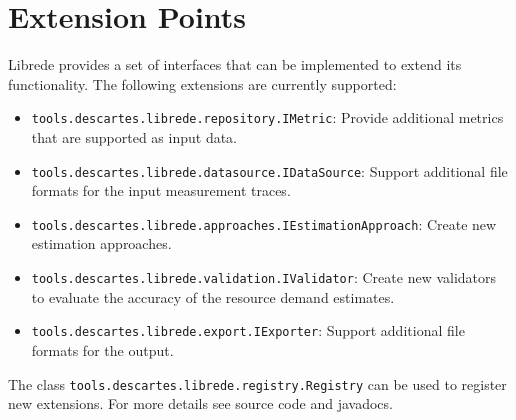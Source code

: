 \section{Extension Points}
\label{sec:Design}
Librede provides a set of interfaces that can be implemented to extend its functionality. The following extensions are currently supported:
\begin{itemize}
\item \texttt{tools.descartes.librede.repository.IMetric}: Provide additional metrics that are supported as input data.
\item \texttt{tools.descartes.librede.datasource.IDataSource}: Support additional file formats for the input measurement traces. 
\item \texttt{tools.descartes.librede.approaches.IEstimationApproach}: Create new estimation approaches.
\item \texttt{tools.descartes.librede.validation.IValidator}: Create new validators to evaluate the accuracy of the resource demand estimates.
\item \texttt{tools.descartes.librede.export.IExporter}: Support additional file formats for the output.
\end{itemize}

The class \texttt{tools.descartes.librede.registry.Registry} can be used to register new extensions. For more details see source code and javadocs.



